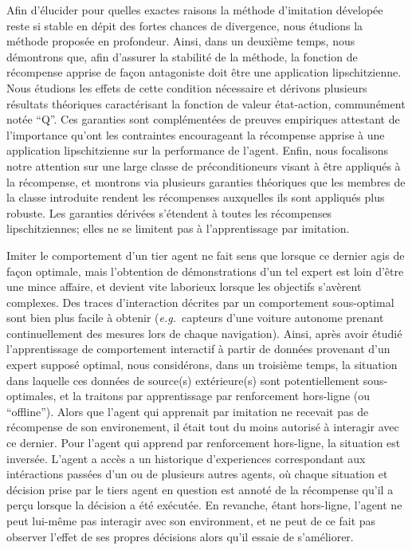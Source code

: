 Afin d'élucider pour quelles exactes raisons la méthode d'imitation
dévelopée reste si stable en dépit des fortes chances de divergence,
nous étudions la méthode proposée en profondeur.
Ainsi, dans un deuxième temps, nous démontrons que,
afin d'assurer la stabilité de la méthode,
la fonction de récompense apprise de façon antagoniste doit
être une application lipschitzienne.
Nous étudions les effets de cette condition nécessaire et dérivons plusieurs
résultats théoriques caractérisant la fonction de valeur état-action,
communément notée ``Q''.
Ces garanties sont complémentées de preuves empiriques attestant de l'importance
qu'ont les contraintes encourageant la récompense apprise
à une application lipschitzienne
sur la performance de l'agent.
Enfin, nous focalisons notre attention sur une large classe de préconditioneurs
visant à être appliqués à la récompense, et montrons via plusieurs garanties théoriques
que les membres de la classe introduite rendent les récompenses auxquelles ils sont
appliqués plus robuste.
Les garanties dérivées s'étendent à toutes les récompenses lipschitziennes;
elles ne se limitent pas à l'apprentissage par imitation.

Imiter le comportement d'un tier agent ne fait sens que lorsque ce dernier agis de
façon optimale, mais l'obtention de démonstrations d'un tel expert est loin d'être
une mince affaire, et devient vite laborieux lorsque les objectifs s'avèrent complexes.
Des traces d'interaction décrites par un comportement sous-optimal sont bien plus
facile à obtenir (\textit{e.g.}~capteurs d'une voiture autonome prenant continuellement
des mesures lors de chaque navigation).
Ainsi, après avoir étudié l'apprentissage de comportement interactif
à partir de données provenant d'un expert supposé optimal,
nous considérons, dans un troisième temps,
la situation dans laquelle ces données de source(s) extérieure(s)
sont potentiellement sous-optimales,
et la traitons par apprentissage par renforcement hors-ligne (ou ``offline'').
Alors que l'agent qui apprenait par imitation ne recevait pas de récompense
de son environement, il était tout du moins autorisé à interagir avec ce dernier.
Pour l'agent qui apprend par renforcement hors-ligne, la situation est inversée.
L'agent a accès a un historique d'experiences correspondant aux intéractions passées
d'un ou de plusieurs autres agents, où chaque situation et décision prise
par le tiers agent en question
est annoté de la récompense qu'il a perçu lorsque la décision a été exécutée.
En revanche, étant hors-ligne, l'agent ne peut lui-même pas interagir avec son environment,
et ne peut de ce fait pas observer l'effet de ses propres décisions alors qu'il essaie de
s'améliorer.

